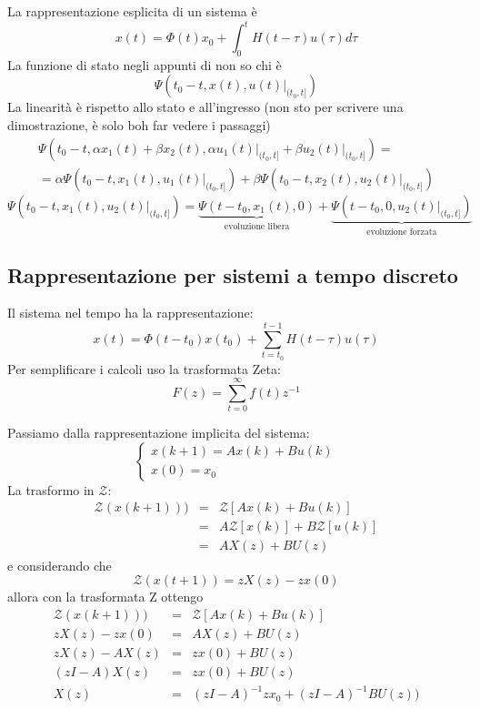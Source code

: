 \documentclass{article}
\begin{document}
La rappresentazione esplicita di un sistema è 
\[ x(t) = \Phi(t)x_0 +\int_{0}^{t} H(t-\tau) u(\tau) d \tau
\]
La funzione di stato negli appunti di non so chi è
\[ \Psi \left(t_0-t,x(t),\left.u(t)\right|_{(t_0,t]}\right) \]
La linearità è rispetto allo stato e all'ingresso 
(non sto per scrivere una dimostrazione, è solo boh far vedere i passaggi)
\
\begin{align*}
    \Psi \left(t_0-t,\alpha x_1(t)+\beta x_2(t),\alpha\left.u_1(t)\right|_{(t_0,t]}+\beta\left.u_2(t)\right|_{(t_0,t]}\right) =\\
    = \alpha\Psi \left(t_0-t,x_1(t),\left.u_1(t)\right|_{(t_0,t]}\right)+\beta\Psi \left(t_0-t,x_2(t),\left.u_2(t)\right|_{(t_0,t]}\right)
\end{align*}
\[
    \Psi \left(t_0-t,x_1(t),\left.u_2(t)\right|_{(t_0,t]}\right)  = \underbrace{\Psi\left(t-t_0,x_1(t),0\right)}_{\text{evoluzione libera}}+
    \underbrace{\Psi\left(t-t_0,0,\left.u_2(t)\right|_{(t_0,t]}\right)}_{\text{evoluzione forzata}}
\]


\subsection{Rappresentazione per sistemi a tempo discreto}
Il sistema nel tempo ha la rappresentazione:
\[x(t) = \Phi(t-t_0)x(t_0)+\sum_{t=t_0}^{t-1}H(t-\tau)u(\tau)\]
Per semplificare i calcoli uso la trasformata Zeta:
\[F(z) = \sum_{t=0}^{\infty}f(t)z^{-1}\]

Passiamo dalla rappresentazione implicita del sistema:
\[\begin{cases}
    x(k+1)=Ax(k)+Bu(k)\\
    x(0)=x_0
\end{cases}
\]
La trasformo in $\mathcal{Z}$:
\[
    \begin{array}{rcl}
        \mathcal{Z} (x(k+1))) & = & \mathcal{Z} [Ax(k)+Bu(k)] \\
         & = & A\mathcal{Z}[x(k)]+B\mathcal{Z} [u(k)] \\
         & = & AX(z)+BU(z)
    \end{array}    
\]
e considerando che \[ \mathcal{Z}(x(t+1)) = zX(z)-zx(0) \]
allora con la trasformata Z ottengo 
\[
\begin{array}{rcl}
    \mathcal{Z} (x(k+1))) & = & \mathcal{Z} [Ax(k)+Bu(k)] \\
    zX(z)-zx(0) & = & AX(z)+BU(z)\\
    zX(z)-AX(z) & = & zx(0)+BU(z)\\
    (zI-A)X(z) & = & zx(0)+BU(z)\\
    X(z) & = & (zI-A)^{-1}zx_0+(zI-A)^{-1}BU(z))
\end{array}
\]
\end{document}
